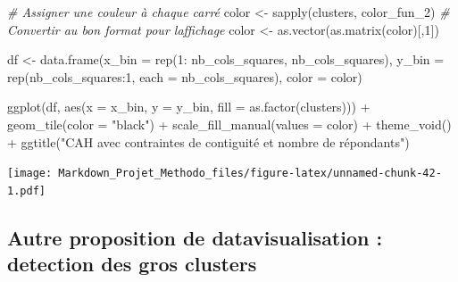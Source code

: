 \documentclass[
]{article}
\newenvironment{Shaded}{\begin{snugshade}}{\end{snugshade}}
\newcommand{\AttributeTok}[1]{\textcolor[rgb]{0.77,0.63,0.00}{#1}}
\newcommand{\CommentTok}[1]{\textcolor[rgb]{0.56,0.35,0.01}{\textit{#1}}}
\newcommand{\DecValTok}[1]{\textcolor[rgb]{0.00,0.00,0.81}{#1}}
\newcommand{\FunctionTok}[1]{\textcolor[rgb]{0.00,0.00,0.00}{#1}}
\newcommand{\NormalTok}[1]{#1}
\newcommand{\OtherTok}[1]{\textcolor[rgb]{0.56,0.35,0.01}{#1}}
\newcommand{\SpecialCharTok}[1]{\textcolor[rgb]{0.00,0.00,0.00}{#1}}
\newcommand{\StringTok}[1]{\textcolor[rgb]{0.31,0.60,0.02}{#1}}
\begin{document}
\begin{Shaded}
\begin{Highlighting}[]
\CommentTok{\# Assigner une couleur à chaque carré}
\NormalTok{color }\OtherTok{\textless{}{-}} \FunctionTok{sapply}\NormalTok{(clusters, color\_fun\_2)}
\CommentTok{\# Convertir au bon format pour l\textquotesingle{}affichage}
\NormalTok{color }\OtherTok{\textless{}{-}} \FunctionTok{as.vector}\NormalTok{(}\FunctionTok{as.matrix}\NormalTok{(color)[,}\DecValTok{1}\NormalTok{])}

\NormalTok{df }\OtherTok{\textless{}{-}} \FunctionTok{data.frame}\NormalTok{(}\AttributeTok{x\_bin =} \FunctionTok{rep}\NormalTok{(}\DecValTok{1}\SpecialCharTok{:}\NormalTok{ nb\_cols\_squares, nb\_cols\_squares), }
                 \AttributeTok{y\_bin =} \FunctionTok{rep}\NormalTok{(nb\_cols\_squares}\SpecialCharTok{:}\DecValTok{1}\NormalTok{, }\AttributeTok{each =}\NormalTok{ nb\_cols\_squares), }
                 \AttributeTok{color =}\NormalTok{ color)}

\FunctionTok{ggplot}\NormalTok{(df, }\FunctionTok{aes}\NormalTok{(}\AttributeTok{x =}\NormalTok{ x\_bin, }\AttributeTok{y =}\NormalTok{ y\_bin, }\AttributeTok{fill =} \FunctionTok{as.factor}\NormalTok{(clusters))) }\SpecialCharTok{+}
  \FunctionTok{geom\_tile}\NormalTok{(}\AttributeTok{color =} \StringTok{"black"}\NormalTok{) }\SpecialCharTok{+}
  \FunctionTok{scale\_fill\_manual}\NormalTok{(}\AttributeTok{values =}\NormalTok{ color) }\SpecialCharTok{+}
  \FunctionTok{theme\_void}\NormalTok{() }\SpecialCharTok{+}
  \FunctionTok{ggtitle}\NormalTok{(}\StringTok{"CAH avec contraintes de contiguité et nombre de répondants"}\NormalTok{)}
\end{Highlighting}
\end{Shaded}

\texttt{[image: Markdown\_Projet\_Methodo\_files/figure-latex/unnamed-chunk-42-1.pdf]}

\hypertarget{autre-proposition-de-datavisualisation-detection-des-gros-clusters}{%
\subsection{Autre proposition de datavisualisation : detection des gros
clusters}\label{autre-proposition-de-datavisualisation-detection-des-gros-clusters}}
\end{document}
